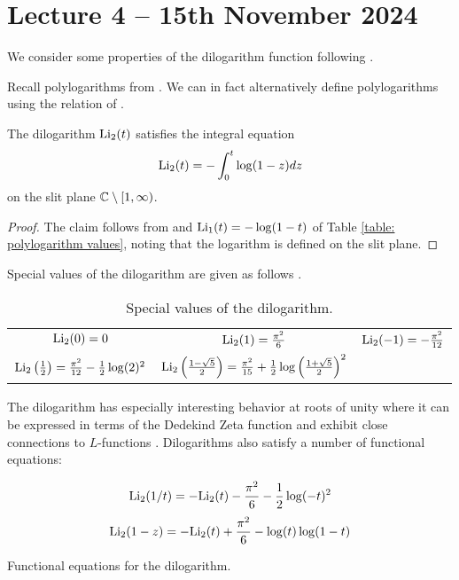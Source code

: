 \section{Lecture 4 -- 15th November 2024}\label{sec: lecture 4}
We consider some properties of the dilogarithm function following \cite{ZagierDilogarithm}. 

Recall polylogarithms from . We can in fact alternatively define polylogarithms using the relation of . 
\begin{lemma}\label{lem: dilogarithm as integral on split plane}
    The dilogarithm $\mathrm{Li}_{2}(t)$ satisfies the integral equation 
    \begin{equation}\label{eqn: dilogarithm integral equation}
        \mathrm{Li}_{2}(t)=-\int_{0}^{t}\log(1-z)dz
    \end{equation}
    on the slit plane $\mathbb{C}\setminus[1,\infty)$. 
\end{lemma}
\begin{proof}
    The claim follows from  and $\mathrm{Li}_{1}(t)=-\log(1-t)$ of Table \ref{table: polylogarithm values}, noting that the logarithm is defined on the slit plane. 
\end{proof}
Special values of the dilogarithm are given as follows \cite[\S 1]{ZagierDilogarithm}. 

\begin{table}[h]\label{table: dilogarithm special values}
    \begin{tabular}{c c c}
        $\mathrm{Li}_{2}(0)=0$ & $\mathrm{Li}_{2}(1)=\frac{\pi^{2}}{6}$ & $\mathrm{Li}_{2}(-1)=-\frac{\pi^{2}}{12}$ \\
        $\mathrm{Li}_{2}\left(\frac{1}{2}\right)=\frac{\pi^{2}}{12}-\frac{1}{2}\log(2)^{2}$ & $\mathrm{Li}_{2}\left(\frac{1-\sqrt{5}}{2}\right)=\frac{\pi^{2}}{15}+\frac{1}{2}\log\left(\frac{1+\sqrt{5}}{2}\right)^{2}$
    \end{tabular}
    \caption{Special values of the dilogarithm.}
\end{table}
The dilogarithm has especially interesting behavior at roots of unity where it can be expressed in terms of the Dedekind Zeta function and exhibit close connections to $L$-functions \cite[\S 5]{ZagierDilogarithm}. Dilogarithms also satisfy a number of functional equations:

\begin{table}[h]\label{table: dilogarithm functional equations}
    \begin{equation}\label{eqn: dilogarithm and negative functional equation}
        \mathrm{Li}_{2}(1/t) = -\mathrm{Li}_{2}(t) - \frac{\pi^{2}}{6}-\frac{1}{2}\log(-t)^{2}
    \end{equation}
    \begin{equation}\label{eqn: dilogarithm and inverse functional equation}
        \mathrm{Li}_{2}(1-z)=-\mathrm{Li}_{2}(t) + \frac{\pi^{2}}{6}-\log(t)\log(1-t)
    \end{equation}
    \caption{Functional equations for the dilogarithm.}
\end{table}

